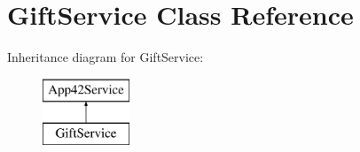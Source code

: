 \hypertarget{class_gift_service}{\section{Gift\+Service Class Reference}
\label{class_gift_service}
}
Inheritance diagram for Gift\+Service\+:\begin{figure}[H]
\begin{center}
\leavevmode
\includegraphics[height=2.000000cm]{class_gift_service}
\end{center}
\end{figure}
